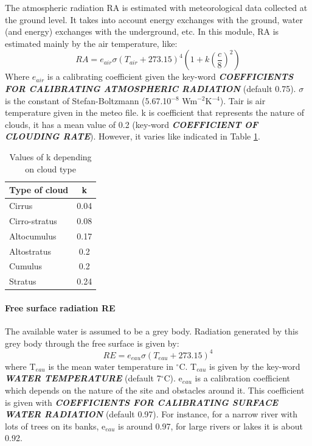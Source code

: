  The atmospheric radiation RA is estimated with meteorological data collected at the ground level. It takes into account energy exchanges with the ground, water (and energy) exchanges with the underground, etc. In this module, RA is estimated mainly by the air temperature, like:
\begin{equation*}
RA=e_{air}\sigma\left(T_{air}+273.15 \right)^4\left(1+k\left(\frac{c}{8}\right)^2 \right)
\end{equation*}
 Where $e_{air}$ is a calibrating coefficient given the key-word \textbf{\textit{COEFFICIENTS FOR CALIBRATING ATMOSPHERIC RADIATION} }(default 0.75). $\sigma$ is the constant of Stefan-Boltzmann (5.67.10${}^{-8}$ Wm${}^{-2}$K${}^{-4}$). Tair is air temperature given in the meteo file. k is coefficient that represents the nature of clouds, it has a mean value of 0.2 (key-word \textbf{\textit{COEFFICIENT OF CLOUDING RATE}}). However, it varies like indicated in Table \ref{tab:kcloud}.
\begin{table}
  \centering
  \begin{tabular}{|l|c|}
     \hline
     Type of cloud & k \\
     \hline \hline
     Cirrus & 0.04 \\
     Cirro-stratus & 0.08 \\
     Altocumulus & 0.17 \\
     Altostratus & 0.2 \\
     Cumulus & 0.2 \\
     Stratus & 0.24\\
     \hline
   \end{tabular}
  \caption{Values of k depending on cloud type}\label{tab:kcloud}
\end{table}



\paragraph{  Free surface radiation RE}

 The available water is assumed to be a grey body. Radiation generated by this grey body through the free surface is given by:
\begin{equation*}
RE=e_{eau}\sigma\left(T_{eau}+273.15 \right)^4
\end{equation*}
where T${}_{eau}$ is the mean water temperature in ${}^\circ$C. T${}_{eau}$ is given by the key-word \textbf{\textit{WATER TEMPERATURE}} (default 7${}^\circ$C). e${}_{eau}$ is a calibration coefficient which depends on the nature of the site and obstacles around it. This coefficient is given with \textbf{\textit{COEFFICIENTS FOR CALIBRATING SURFACE WATER RADIATION}} (default 0.97). For instance, for a narrow river with lots of trees on its banks, e${}_{eau}$ is around 0.97, for large rivers or lakes it is about 0.92.


